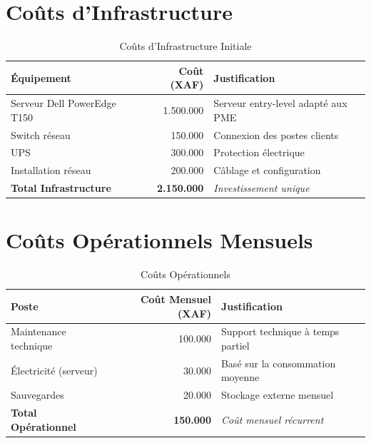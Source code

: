 \documentclass[14pt,a4paper]{report}
\begin{document}
\section{Coûts d'Infrastructure}
\begin{table}[h]
    \centering
    \begin{tabular}{|l|r|p{6cm}|}
        \hline
        \textbf{Équipement} & \textbf{Coût (XAF)} & \textbf{Justification} \\
        \hline
        Serveur Dell PowerEdge T150 & 1.500.000 & Serveur entry-level adapté aux PME \\
        \hline
        Switch réseau & 150.000 & Connexion des postes clients \\
        \hline
        UPS & 300.000 & Protection électrique \\
        \hline
        Installation réseau & 200.000 & Câblage et configuration \\
        \hline
        \textbf{Total Infrastructure} & \textbf{2.150.000} & \textit{Investissement unique} \\
        \hline
    \end{tabular}
    \caption{Coûts d'Infrastructure Initiale}
\end{table}

\section{Coûts Opérationnels Mensuels}
\begin{table}[h]
    \centering
    \begin{tabular}{|l|r|p{6cm}|}
        \hline
        \textbf{Poste} & \textbf{Coût Mensuel (XAF)} & \textbf{Justification} \\
        \hline
        Maintenance technique & 100.000 & Support technique à temps partiel \\
        \hline
        Électricité (serveur) & 30.000 & Basé sur la consommation moyenne \\
        \hline
        Sauvegardes & 20.000 & Stockage externe mensuel \\
        \hline
        \textbf{Total Opérationnel} & \textbf{150.000} & \textit{Coût mensuel récurrent} \\
        \hline
    \end{tabular}
    \caption{Coûts Opérationnels}
\end{table}
\end{document}
